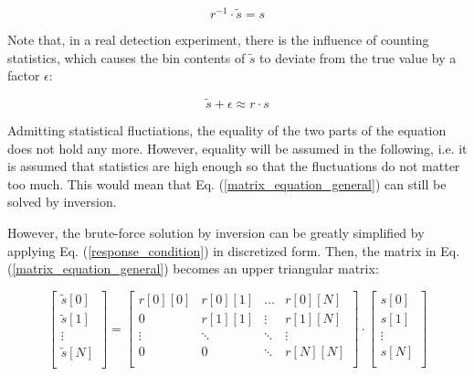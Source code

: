 \documentclass{article}
\begin{document}
\begin{equation}
	\label{matrix_equation_solved}
	r^{-1} \cdot \tilde{s} = s
\end{equation}

Note that, in a real detection experiment, there is the influence of counting statistics, which causes the bin contents of $\tilde{s}$ to deviate from the true value by a factor $\epsilon$:

\begin{equation}
	\label{matrix_equation_statistics}
	\tilde{s} + \epsilon \approx r \cdot s
\end{equation}

Admitting statistical fluctiations, the equality of the two parts of the equation does not hold any more.
However, equality will be assumed in the following, i.e. it is assumed that statistics are high enough so that the fluctuations do not matter too much.
This would mean that Eq. (\ref{matrix_equation_general}) can still be solved by inversion.

However, the brute-force solution by inversion can be greatly simplified by applying Eq. (\ref{response_condition}) in discretized form. 
Then, the matrix in Eq. (\ref{matrix_equation_general}) becomes an upper triangular matrix:

\begin{equation}
	\label{matrix_equation_triangle_explicit}
	\left[ 
		\begin{array}{c}
			\tilde{s}[0] \\
			\tilde{s}[1] \\
			\vdots	\\
			\tilde{s}[N] \\
		\end{array}
	\right]
	= 
	\begin{bmatrix}
		r[0][0] & r[0][1] & \hdots & r[0][N] \\
		0       & r[1][1] & \vdots & r[1][N] \\
		\vdots  & \ddots  & \ddots & \vdots  \\
		0       & 0       & \ddots & r[N][N] \\
	\end{bmatrix}
	\cdot
	\left[ 
		\begin{array}{c}
			s[0] \\
			s[1] \\
			\vdots	\\
			s[N] \\
		\end{array}
	\right]
\end{equation}
\end{document}
